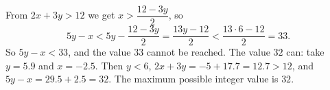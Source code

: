 From $2x+3y>12$ we get $x>\dfrac{12-3y}{2}$, so
\[
5y-x<5y-\dfrac{12-3y}{2}=\dfrac{13y-12}{2}<\dfrac{13\cdot6-12}{2}=33 .
\]
So $5y-x<33$, and the value $33$ cannot be reached. The value $32$ can: take $y=5.9$ and $x=-2.5$. Then $y<6$, $2x+3y=-5+17.7=12.7>12$, and $5y-x=29.5+2.5=32$. The maximum possible integer value is $\boxed{32}$.
